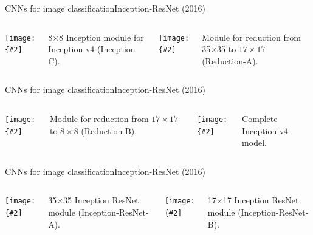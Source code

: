 \documentclass{beamer}
\newcommand{\myfig}[3]{\centerline{\texttt{[image: \{\#2]}}}
\begin{document}
\begin{frame}{CNNs for image classification}{Inception-ResNet (2016)}

  \begin{columns}

    \column{2.2in}
    
    \myfig{2in}{szegedy-16-fig6}{Szegedy et at.\ (2017), Fig.\ 6}

    \medskip

    8$\times$8 Inception module for Inception v4 (Inception C).
    
    \column{2.2in}
    
    \myfig{2in}{szegedy-16-fig7}{Szegedy et at.\ (2017), Fig.\ 7}

    \medskip

    Module for reduction from 35$\times$35 to $17\times 17$ (Reduction-A).

  \end{columns}
  
\end{frame}


\begin{frame}{CNNs for image classification}{Inception-ResNet (2016)}

  \begin{columns}

    \column{2in}
    
    \myfig{2in}{szegedy-16-fig8}{Szegedy et at.\ (2017), Fig.\ 8}

    \medskip

    Module for reduction from $17\times 17$ to $8\times 8$ (Reduction-B).

    \column{1.1in}

    \myfig{1in}{szegedy-16-fig9}{Szegedy et at.\ (2017), Fig.\ 9}

    \column{1.4in}
  
    Complete Inception v4 model.

  \end{columns}
  
\end{frame}


\begin{frame}{CNNs for image classification}{Inception-ResNet (2016)}

  \begin{columns}

    \column{2in}
    
    \myfig{2in}{szegedy-16-fig10}{Szegedy et at.\ (2017), Fig.\ 10}

    \medskip

    35$\times$35 Inception ResNet module (Inception-ResNet-A).

    \column{2in}
    
    \myfig{1.8in}{szegedy-16-fig11}{Szegedy et at.\ (2017), Fig.\ 11}

    \medskip

    17$\times$17 Inception ResNet module (Inception-ResNet-B).

  \end{columns}
  
\end{frame}
\end{document}
